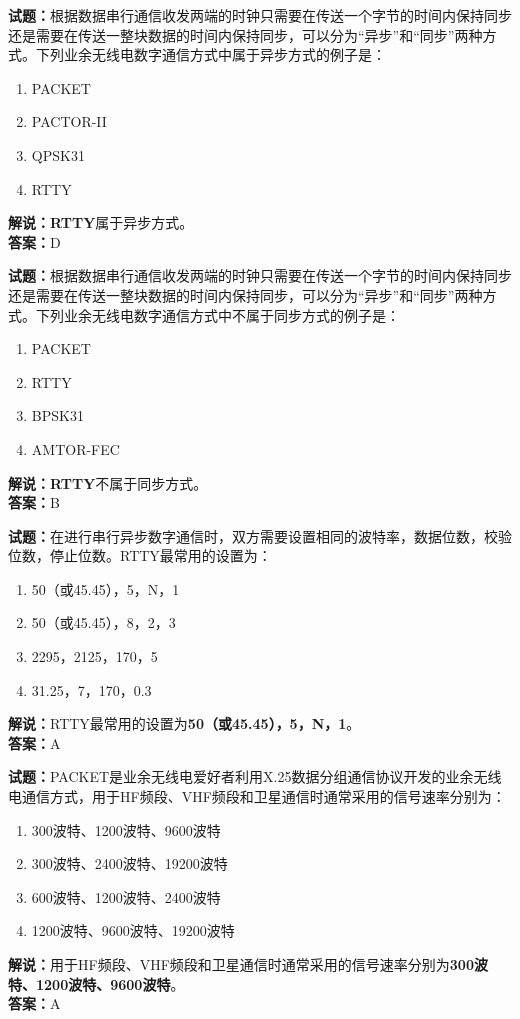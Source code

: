 \documentclass{ctexbook}
\begin{document}
\bigskip


\noindent\textbf{试题：}根据数据串行通信收发两端的时钟只需要在传送一个字节的时间内保持同步还是需要在传送一整块数据的时间内保持同步，可以分为“异步”和“同步”两种方式。下列业余无线电数字通信方式中属于异步方式的例子是：
\begin{enumerate}[leftmargin=3em]
\item PACKET
\item PACTOR-II
\item QPSK31
\item RTTY
\end{enumerate}
\noindent\textbf{解说：}\textbf{RTTY}属于异步方式。\\\noindent\textbf{答案：}D



\bigskip


\noindent\textbf{试题：}根据数据串行通信收发两端的时钟只需要在传送一个字节的时间内保持同步还是需要在传送一整块数据的时间内保持同步，可以分为“异步”和“同步”两种方式。下列业余无线电数字通信方式中不属于同步方式的例子是：
\begin{enumerate}[leftmargin=3em]
\item PACKET
\item RTTY
\item BPSK31
\item AMTOR-FEC
\end{enumerate}
\noindent\textbf{解说：}\textbf{RTTY}不属于同步方式。\\\noindent\textbf{答案：}B



\bigskip


\noindent\textbf{试题：}在进行串行异步数字通信时，双方需要设置相同的波特率，数据位数，校验位数，停止位数。RTTY最常用的设置为：
\begin{enumerate}[leftmargin=3em]
\item 50（或45.45），5，N，1
\item 50（或45.45），8，2，3
\item 2295，2125，170，5
\item 31.25，7，170，0.3
\end{enumerate}
\noindent\textbf{解说：}RTTY最常用的设置为\textbf{50（或45.45），5，N，1}。\\\noindent\textbf{答案：}A



\bigskip


\noindent\textbf{试题：}PACKET是业余无线电爱好者利用X.25数据分组通信协议开发的业余无线电通信方式，用于HF频段、VHF频段和卫星通信时通常采用的信号速率分别为：
\begin{enumerate}[leftmargin=3em]
\item 300波特、1200波特、9600波特
\item 300波特、2400波特、19200波特
\item 600波特、1200波特、2400波特
\item 1200波特、9600波特、19200波特
\end{enumerate}
\noindent\textbf{解说：}用于HF频段、VHF频段和卫星通信时通常采用的信号速率分别为\textbf{300波特、1200波特、9600波特}。\\\noindent\textbf{答案：}A
\end{document}
